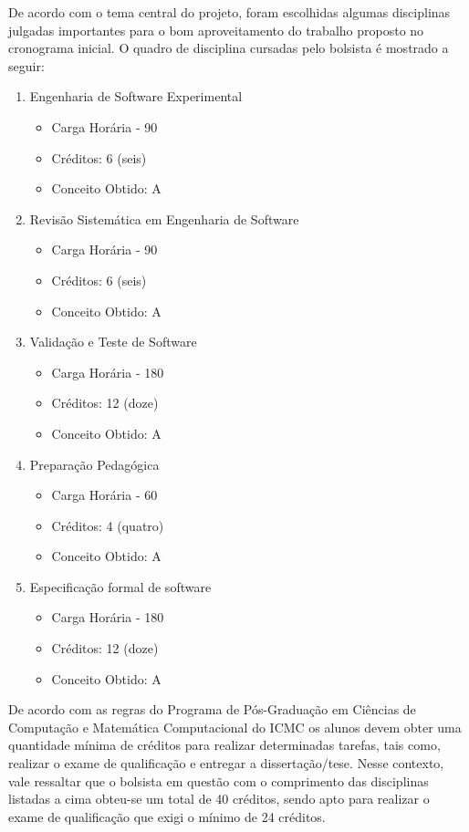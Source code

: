 
De acordo com o tema central do projeto, foram escolhidas algumas disciplinas julgadas importantes para o bom aproveitamento do trabalho proposto no cronograma inicial. O quadro de disciplina cursadas pelo bolsista é mostrado a seguir:

\begin{enumerate}
	\item Engenharia de Software Experimental
		\begin{itemize}
			\item Carga Horária - 90
			\item Créditos: 6 (seis)
			\item Conceito Obtido: A
		\end{itemize}
	\item Revisão Sistemática em Engenharia de Software
		\begin{itemize}
			\item Carga Horária - 90
			\item Créditos: 6 (seis)
			\item Conceito Obtido: A
		\end{itemize}
	\item Validação e Teste de Software
		\begin{itemize}
			\item Carga Horária - 180
			\item Créditos: 12 (doze)
			\item Conceito Obtido: A
		\end{itemize}
	\item Preparação Pedagógica
		\begin{itemize}
			\item Carga Horária - 60
			\item Créditos: 4 (quatro)
			\item Conceito Obtido: A 
		\end{itemize}
	\item Especificação formal de software
		\begin{itemize}
			\item Carga Horária - 180
			\item Créditos: 12 (doze)
			\item Conceito Obtido: A
		\end{itemize}
\end{enumerate}

De acordo com as regras do Programa de Pós-Graduação em Ciências de Computação e Matemática Computacional do ICMC os alunos devem obter uma quantidade mínima de créditos para realizar determinadas tarefas, tais como, realizar o exame de qualificação e entregar a dissertação/tese. Nesse contexto, vale ressaltar que o bolsista em questão com o comprimento das disciplinas listadas a cima obteu-se um total de 40 créditos, sendo apto para realizar o exame de qualificação que exigi o mínimo de 24 créditos.%


